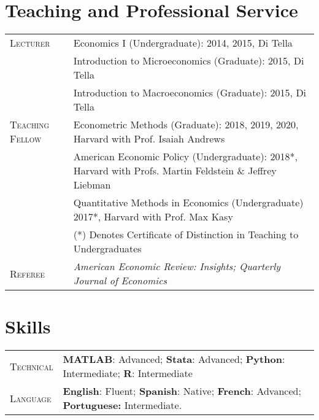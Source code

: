 \documentclass[letterpaper,9pt]{article} %
\begin{document}
\section{Teaching and Professional Service}
\begin{tabular}{>{\raggedleft\arraybackslash}p{}|p{}}
	\textsc{Lecturer} & Economics I (Undergraduate):  \footnotesize{2014, 2015, Di Tella} \\
	& Introduction to Microeconomics (Graduate): \footnotesize{2015, Di Tella} \\
	& Introduction to Macroeconomics (Graduate): \footnotesize{2015, Di Tella} \\	
	\textsc{Teaching Fellow} & Econometric Methods (Graduate): \footnotesize{2018, 2019, 2020, Harvard with Prof. Isaiah Andrews} \\
	& American Economic Policy (Undergraduate): \footnotesize{2018*, Harvard with Profs. Martin Feldstein \& Jeffrey Liebman} \\
	& Quantitative Methods in Economics (Undergraduate) \footnotesize{2017*, Harvard with Prof. Max Kasy} \\
	& \footnotesize{(*) Denotes Certificate of Distinction in Teaching to Undergraduates} \\
	\textsc{Referee} & \emph{American Economic Review: Insights; Quarterly Journal of Economics} \\
	
\end{tabular}
	
\section{Skills}
\begin{tabular}[htb]{>{\raggedleft\arraybackslash}p{}|p{}}
	\textsc{Technical} & \textbf{MATLAB}: Advanced; \textbf{Stata}: Advanced; \textbf{Python}: Intermediate; \textbf{R}: Intermediate \\
	
	\textsc{Language} & \textbf{English}: Fluent; \textbf{Spanish}: Native; \textbf{French}: Advanced; \textbf{Portuguese:} Intermediate. \\

\end{tabular}
\end{document}
